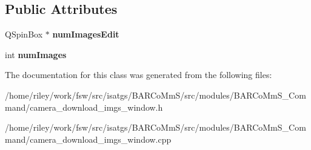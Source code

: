 \subsection*{Public Attributes}
\begin{DoxyCompactItemize}
\item 
Q\+Spin\+Box $\ast$ {\bfseries num\+Images\+Edit}\hypertarget{class_camera___download___imgs___window_a62a219798180c816c20261128503b087}{}\label{class_camera___download___imgs___window_a62a219798180c816c20261128503b087}

\item 
int {\bfseries num\+Images}\hypertarget{class_camera___download___imgs___window_a26781cddb49073c988e23ec45ff1528e}{}\label{class_camera___download___imgs___window_a26781cddb49073c988e23ec45ff1528e}

\end{DoxyCompactItemize}


The documentation for this class was generated from the following files\+:\begin{DoxyCompactItemize}
\item 
/home/riley/work/fsw/src/isatgs/\+B\+A\+R\+Co\+Mm\+S/src/modules/\+B\+A\+R\+Co\+Mm\+S\+\_\+\+Command/camera\+\_\+download\+\_\+imgs\+\_\+window.\+h\item 
/home/riley/work/fsw/src/isatgs/\+B\+A\+R\+Co\+Mm\+S/src/modules/\+B\+A\+R\+Co\+Mm\+S\+\_\+\+Command/camera\+\_\+download\+\_\+imgs\+\_\+window.\+cpp\end{DoxyCompactItemize}
